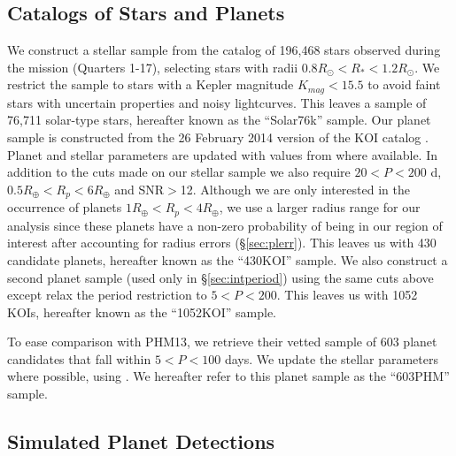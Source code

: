 \subsection{Catalogs of Stars and Planets}
\label{sec:catalogs}
We construct a stellar sample from the \cite{Huber2014} catalog of
196,468 stars observed during the \kep{} mission (Quarters 1-17),
selecting stars with radii $0.8R_{\odot}<R_*<1.2R_{\odot}$. We
restrict the sample to stars with a Kepler magnitude $K_{mag}<15.5$ to
avoid faint stars with uncertain properties and noisy lightcurves.
This leaves a sample of 76,711 solar-type stars, hereafter known as
the ``Solar76k'' sample.  Our planet sample is constructed from the 26
February 2014 version of the KOI catalog \citep{Ramirez2014}.  Planet
and stellar parameters are updated with values from \cite{Huber2014}
where available.  In addition to the cuts made on our stellar sample
we also require $20<P<200$ d, $0.5R_{\oplus}<R_p<6R_{\oplus}$ and
SNR$>$12. Although we are only interested in the occurrence of planets 
$1R_{\oplus}<R_p<4R_{\oplus}$, we use a larger radius range for our analysis 
since these planets have a non-zero probability of being in our region of 
interest after accounting for radius errors (\S\ref{sec:plerr}).
This leaves us with 430 candidate planets, hereafter known
as the ``430KOI'' sample. We also construct a second planet sample
(used only in \S\ref{sec:intperiod}) using the same cuts above
except relax the period restriction to $5<P<200$.  This leaves us with
1052 KOIs, hereafter known as the ``1052KOI'' sample.

To ease comparison with PHM13, we retrieve their vetted sample of
603 planet candidates that fall within $5<P<100$ days. We update the stellar
parameters where possible, using \citet{Huber2014}.  We hereafter
refer to this planet sample as the ``603PHM'' sample.

\subsection{ Simulated Planet Detections}
\label{sec:geneq}

